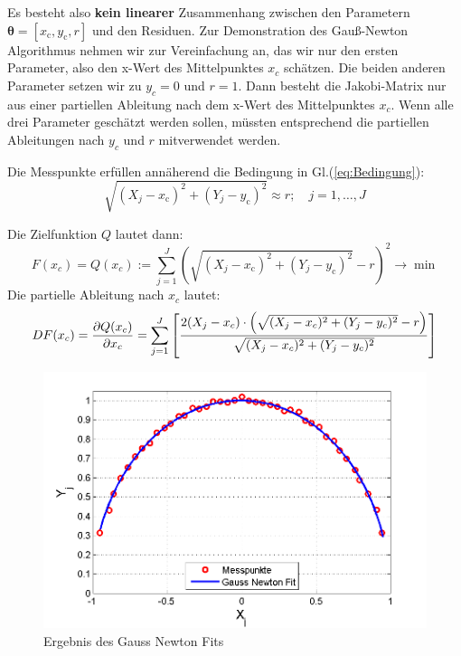 Es besteht also \textbf{kein linearer} Zusammenhang zwischen den Parametern 
$\boldsymbol\theta = [x_\mathrm{c},y_\mathrm{c},r]$ und den 
Residuen.
Zur Demonstration des Gauß-Newton Algorithmus nehmen wir zur Vereinfachung an, das wir nur den ersten Parameter, also den 
x-Wert des Mittelpunktes $x_c$ schätzen. Die beiden anderen 
Parameter setzen wir zu $y_c=0$ und $r=1$.
Dann besteht die Jakobi-Matrix nur aus einer partiellen Ableitung nach dem x-Wert des Mittelpunktes $x_c$. Wenn alle drei Parameter geschätzt werden sollen, müssten entsprechend die partiellen Ableitungen nach $y_c$ und $r$ mitverwendet werden.

Die Messpunkte erfüllen annäherend die Bedingung in Gl.(\ref{eq:Bedingung}):
\[
\sqrt{(X_j-x_\mathrm{c})^2+(Y_j-y_\mathrm{c})^2} \approx r; \quad j=1,\ldots,J
\]

Die Zielfunktion $Q$ lautet dann:
\begin{equation}
	F(x_c) = Q(x_c) := \sum_{j=1}^{J} \left( \sqrt{(X_j-x_\mathrm{c})^2+(Y_j-y_\mathrm{c})^2}-r\right)^2
	\rightarrow \min
\end{equation}
Die partielle Ableitung nach $x_c$ lautet:
\begin{equation}
	DF(x_c) = \frac{\partial Q(x_c)}{\partial x_c} = \displaystyle\sum_{j=1}^{J} \left[
	\frac{2(X_j-x_c)\cdot \left( \sqrt{(X_j-x_c)^2 +(Y_j-y_c)^2}-r\right)}
	{\sqrt{(X_j-x_c)^2+(Y_j-y_c)^2}} \right] 
\end{equation}
\begin{figure}[!htp]
	\begin{center}
		\includegraphics[width=140mm]{03_vorlesung/media/Kreisfit_Gauss_Newton.png}
		\caption{Ergebnis des Gauss Newton Fits}
		\label{fig:Kreisfit_Gauss_Newton}
	\end{center}
\end{figure}
